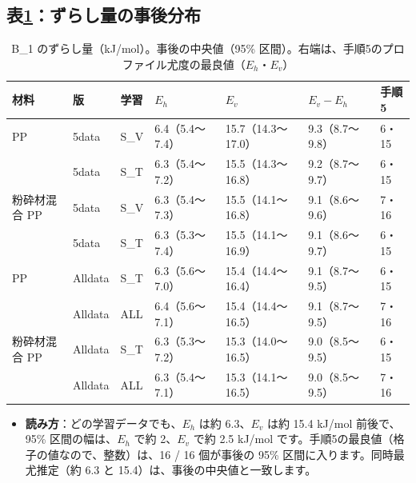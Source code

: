 \documentclass[paper=a4paper,fontsize=10.5pt,line_length=44zw,number_of_lines=38]{jlreq}
\newcommand{\Eh}{E_{h}}
\newcommand{\Ev}{E_{v}}
\newenvironment{points}{\begin{itemize}[label=$\triangleright$,leftmargin=1.5\zw,itemsep=0.3ex,topsep=0.5ex,parsep=0pt]}{\end{itemize}}
\newcommand{\pt}[1]{\item \textbf{#1}：}
\begin{document}
\subsection{表\ref{tab:E}：ずらし量の事後分布}
\begin{table}[H]
\caption{B\_1 のずらし量（kJ/mol）。事後の中央値（95\% 区間）。右端は、手順5のプロファイル尤度の最良値（$\Eh$・$\Ev$）}\label{tab:E}
\footnotesize
\begin{tabularx}{\linewidth}{@{}lllXXXl@{}}
\toprule
材料 & 版 & 学習 & $\Eh$ & $\Ev$ & $\Ev-\Eh$ & 手順5 \\
\midrule
PP & 5data & S\_V & 6.4（5.4〜7.4） & 15.7（14.3〜17.0） & 9.3（8.7〜9.8） & 6・15 \\
 & 5data & S\_T & 6.3（5.4〜7.2） & 15.5（14.3〜16.8） & 9.2（8.7〜9.7） & 6・15 \\
粉砕材混合 PP & 5data & S\_V & 6.3（5.4〜7.3） & 15.5（14.1〜16.8） & 9.1（8.6〜9.6） & 7・16 \\
 & 5data & S\_T & 6.3（5.3〜7.4） & 15.5（14.1〜16.9） & 9.1（8.6〜9.7） & 6・15 \\
PP & Alldata & S\_T & 6.3（5.6〜7.0） & 15.4（14.4〜16.4） & 9.1（8.7〜9.5） & 6・15 \\
 & Alldata & ALL & 6.4（5.6〜7.1） & 15.4（14.4〜16.5） & 9.1（8.7〜9.5） & 7・16 \\
粉砕材混合 PP & Alldata & S\_T & 6.3（5.3〜7.2） & 15.3（14.0〜16.5） & 9.0（8.5〜9.5） & 6・15 \\
 & Alldata & ALL & 6.3（5.4〜7.1） & 15.3（14.1〜16.5） & 9.0（8.5〜9.5） & 7・16 \\
\bottomrule
\end{tabularx}
\end{table}
\begin{points}
\pt{読み方}どの学習データでも、$\Eh$ は約 6.3、$\Ev$ は約 15.4 kJ/mol 前後で、95\% 区間の幅は、$\Eh$ で約 2、$\Ev$ で約 2.5 kJ/mol です。手順5の最良値（格子の値なので、整数）は、16 / 16 個が事後の 95\% 区間に入ります。同時最尤推定（約 6.3 と 15.4）は、事後の中央値と一致します。
\end{points}
\end{document}

